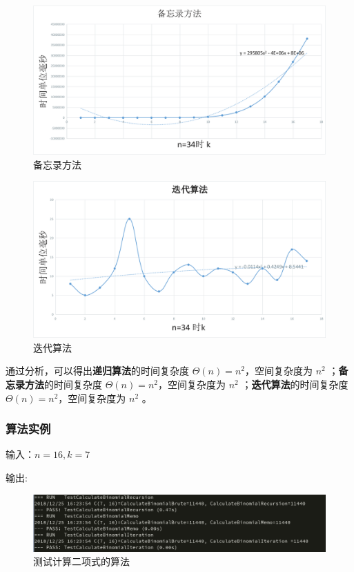 \documentclass{ctexart}
\begin{document}
\begin{figure}[H]
	\centering
	\includegraphics[scale=0.5]{../images/memo.png}
	\caption{备忘录方法}
\end{figure}

\begin{figure}[H]
	\centering
	\includegraphics[scale=0.4]{../images/iteration.png}
	\caption{迭代算法}
\end{figure}

通过分析，可以得出{\bfseries 递归算法}的时间复杂度 $\Theta(n) = n^2$，空间复杂度为 $n^2$ ；{\bfseries 备忘录方法}的时间复杂度 $\Theta(n) = n^2，$空间复杂度为 $n^2$ ；{\bfseries 迭代算法}的时间复杂度 $\Theta(n) = n^2$，空间复杂度为 $n^2$ 。
\subsubsection{算法实例}
输入：$n=16, k=7$ 

输出:

\begin{figure}[H]
	\centering
	\includegraphics[scale=0.5]{../images/binomial-test.png}
	\caption{测试计算二项式的算法}
\end{figure}
\end{document}
